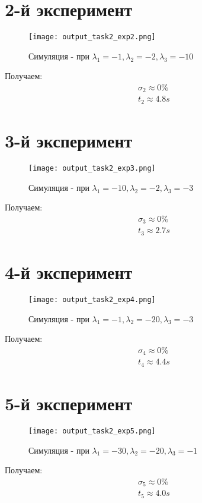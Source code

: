 \newpage
\section{2-й эксперимент}
\begin{figure}[ht]
    \centering
    \texttt{[image: output\_task2\_exp2.png]}
  \caption{Симуляция - при $\lambda_1 = -1, \lambda_2 = -2,\lambda_3 = -10$}
\end{figure}
Получаем:
$$
\begin{aligned}
  \sigma_2 \approx 0\% \\
  t_2 \approx 4.8s
\end{aligned}
$$

\newpage
\section{3-й эксперимент}
\begin{figure}[ht]
    \centering
    \texttt{[image: output\_task2\_exp3.png]}
  \caption{Симуляция - при $\lambda_1 = -10, \lambda_2 = -2,\lambda_3 = -3$}
\end{figure}
Получаем:
$$
\begin{aligned}
  \sigma_3 \approx 0\% \\
  t_3 \approx 2.7s
\end{aligned}
$$

\newpage
\section{4-й эксперимент}
\begin{figure}[ht]
    \centering
    \texttt{[image: output\_task2\_exp4.png]}
  \caption{Симуляция - при $\lambda_1 = -1, \lambda_2 = -20,\lambda_3 = -3$}
\end{figure}
Получаем:
$$
\begin{aligned}
  \sigma_4 \approx 0\% \\
  t_4 \approx 4.4s
\end{aligned}
$$

\newpage
\section{5-й эксперимент}
\begin{figure}[ht]
    \centering
    \texttt{[image: output\_task2\_exp5.png]}
  \caption{Симуляция - при $\lambda_1 = -30, \lambda_2 = -20,\lambda_3 = -1$}
\end{figure}
Получаем:
$$
\begin{aligned}
  \sigma_5 \approx 0\% \\
  t_5 \approx 4.0s
\end{aligned}
$$

